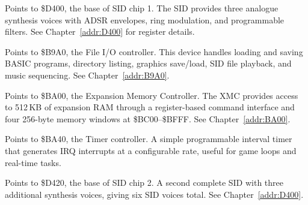 

Points to \$D400, the base of SID chip 1.  The SID provides three analogue
synthesis voices with ADSR envelopes, ring modulation, and programmable
filters.  See Chapter~\ref{addr:D400} for register details.



Points to \$B9A0, the File I/O controller.  This device handles loading and
saving BASIC programs, directory listing, graphics save/load, SID file
playback, and music sequencing.  See Chapter~\ref{addr:B9A0}.



Points to \$BA00, the Expansion Memory Controller.  The XMC provides access
to 512\,KB of expansion RAM through a register-based command interface and
four 256-byte memory windows at \$BC00--\$BFFF.
See Chapter~\ref{addr:BA00}.



Points to \$BA40, the Timer controller.  A simple programmable interval timer
that generates IRQ interrupts at a configurable rate, useful for game loops
and real-time tasks.



Points to \$D420, the base of SID chip 2.  A second complete SID with three
additional synthesis voices, giving six SID voices total.
See Chapter~\ref{addr:D400}.



